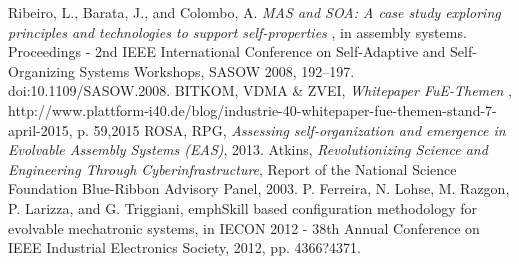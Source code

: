 \documentclass[10pt,letterpaper,twocolumn]{IEEEtran}
\begin{document}
\begin{thebibliography}{99}
 Ribeiro, L., Barata, J., and Colombo, A.
\emph{ MAS and SOA: A case study exploring principles and technologies to support self-properties }, in assembly systems. Proceedings - 2nd IEEE International Conference on Self-Adaptive and Self-Organizing Systems Workshops, SASOW 2008, 192–197. doi:10.1109/SASOW.2008.
BITKOM, VDMA \& ZVEI,
\emph{Whitepaper FuE-Themen }, http://www.plattform-i40.de/blog/industrie-40-whitepaper-fue-themen-stand-7-april-2015, p. 59,2015
ROSA, RPG,
\emph{Assessing self-organization and emergence in Evolvable Assembly Systems (EAS)}, 2013.
 Atkins,
\emph{Revolutionizing Science and Engineering Through Cyberinfrastructure}, Report of the National Science Foundation Blue-Ribbon Advisory Panel, 2003.		
 P. Ferreira, N. Lohse, M. Razgon, P. Larizza, and G. Triggiani, 
emph{Skill based configuration methodology for evolvable mechatronic systems}, in IECON 2012 - 38th Annual Conference on IEEE Industrial Electronics Society, 2012, pp. 4366?4371.		




		
	
	

\end{thebibliography}
\end{document}
